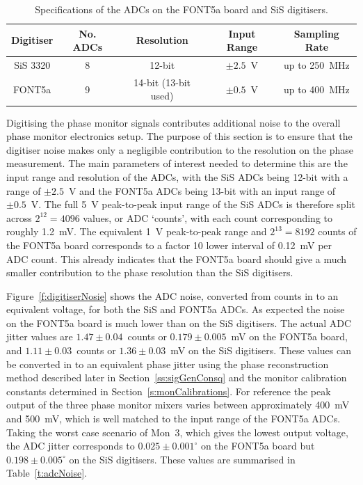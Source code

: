 \begin{table}
  \begin{center}
    \begin{tabular}{|c c c c c|}
	   \hline
       Digitiser & No. ADCs & Resolution & Input Range & Sampling Rate  \\ \hline
       SiS 3320 & 8 & 12-bit & \(\pm2.5\)~V & up to 250~MHz \\
       FONT5a & 9 & 14-bit (13-bit used) & \(\pm0.5\)~V & up to 400~MHz \\ \hline
    \end{tabular}
    \caption{Specifications of the ADCs on the FONT5a board and SiS digitisers.}
  	\label{t:adcSpecs}
  \end{center}
\end{table}

Digitising the phase monitor signals contributes additional noise to the overall phase monitor electronics setup. The purpose of this section is to ensure that the digitiser noise makes only a negligible contribution to the resolution on the phase measurement. The main parameters of interest needed to determine this are the input range and resolution of the ADCs, with the SiS ADCs being 12-bit with a range of \(\pm2.5\)~V and the FONT5a ADCs being 13-bit with an input range of \(\pm0.5\)~V. The full 5~V peak-to-peak input range of the SiS ADCs is therefore split across \(2^{12}=4096\) values, or ADC `counts', with each count corresponding to roughly 1.2~mV. The equivalent 1~V peak-to-peak range and \(2^{13}=8192\) counts of the FONT5a board corresponds to a factor 10 lower interval of 0.12~mV per ADC count. This already indicates that the FONT5a board should give a much smaller contribution to the phase resolution than the SiS digitisers.

Figure~\ref{f:digitiserNosie} shows the ADC noise, converted from counts in to an equivalent voltage, for both the SiS and FONT5a ADCs. As expected the noise on the FONT5a board is much lower than on the SiS digitisers. The actual ADC jitter values are \(1.47\pm0.04\)~counts or \(0.179\pm0.005\)~mV on the FONT5a board, and \(1.11\pm0.03\)~counts or \(1.36\pm0.03\)~mV on the SiS digitisers. These values can be converted in to an equivalent phase jitter using the phase reconstruction method described later in Section~\ref{ss:sigGenConsq} and the monitor calibration constants determined in Section~\ref{s:monCalibrations}. For reference the peak output of the three phase monitor mixers varies between approximately 400~mV and 500~mV, which is well matched to the input range of the FONT5a ADCs. Taking the worst case scenario of Mon~3, which gives the lowest output voltage, the ADC jitter corresponds to \(0.025\pm0.001^\circ\) on the FONT5a board but \(0.198\pm0.005^\circ\) on the SiS digitisers. These values are summarised in Table~\ref{t:adcNoise}.


